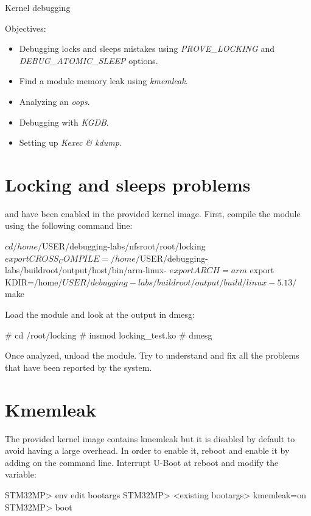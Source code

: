 \subchapter
{Kernel debugging}
{Objectives:
  \begin{itemize}
    \item Debugging locks and sleeps mistakes using {\em PROVE\_LOCKING} and {\em
    DEBUG\_ATOMIC\_SLEEP} options.
    \item Find a module memory leak using {\em kmemleak}.
    \item Analyzing an {\em oops}.
    \item Debugging with {\em KGDB}.
    \item Setting up {\em Kexec \& kdump}.
  \end{itemize}
}

\section{Locking and sleeps problems}

 and  have been
enabled in the provided kernel image.
First, compile the module using the following command line:

\begin{bashinput}
$ cd /home/$USER/debugging-labs/nfsroot/root/locking
$ export CROSS_COMPILE=/home/$USER/debugging-labs/buildroot/output/host/bin/arm-linux-
$ export ARCH=arm
$ export KDIR=/home/$USER/debugging-labs/buildroot/output/build/linux-5.13/
$ make
\end{bashinput}

Load the  module and look at the output in dmesg:

\begin{bashinput}
# cd /root/locking
# insmod locking_test.ko
# dmesg
\end{bashinput}

Once analyzed, unload the module. Try to understand and fix all the problems that
have been reported by the  system.

\section{Kmemleak}

The provided kernel image contains kmemleak but it is disabled by default to
avoid having a large overhead. In order to enable it, reboot and enable it by
adding  on the command line. Interrupt U-Boot at reboot and
modify the  variable:

\begin{bashinput}
STM32MP> env edit bootargs
STM32MP> <existing bootargs> kmemleak=on
STM32MP> boot
\end{bashinput}

